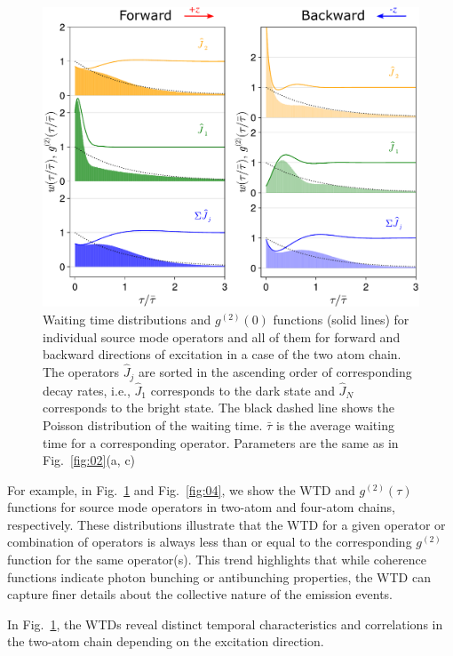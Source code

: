 \documentclass[aps,prl,twocolumn,superscriptaddress,showpacs,amsmath,amssymb]{revtex4-2}
\begin{document}
\begin{figure}
    \begin{center}
        \includegraphics[width=0.95\columnwidth]{fig_3}
    \end{center}
\caption{Waiting time distributions and $g^{(2)}(0)$ functions (solid lines) for individual source mode operators and all of them for forward and backward directions of excitation in a case of the two atom chain. The operators $\hat{J}_j$ are sorted in the ascending order of corresponding decay
rates, i.e., $\hat{J}_1$ corresponds to the dark state and $\hat{J}_N$ corresponds to the bright state. The black dashed line shows the Poisson distribution of the waiting time. $\bar{\tau}$ is the average waiting time for a corresponding operator. Parameters are the same as in Fig.~\ref{fig:02}(a, c)}\label{fig:03}
\end{figure}

For example, in Fig.~\ref{fig:03} and Fig.~\ref{fig:04}, we show the WTD and $ g^{(2)}(\tau) $ functions for source mode operators in two-atom and four-atom chains, respectively. These distributions illustrate that the WTD for a given operator or combination of operators is always less than or equal to the corresponding $ g^{(2)} $ function for the same operator(s). This trend highlights that while coherence functions indicate photon bunching or antibunching properties, the WTD can capture finer details about the collective nature of the emission events.

In Fig.~\ref{fig:03}, the WTDs reveal distinct temporal characteristics and correlations in the two-atom chain depending on the excitation direction. 
\end{document}
